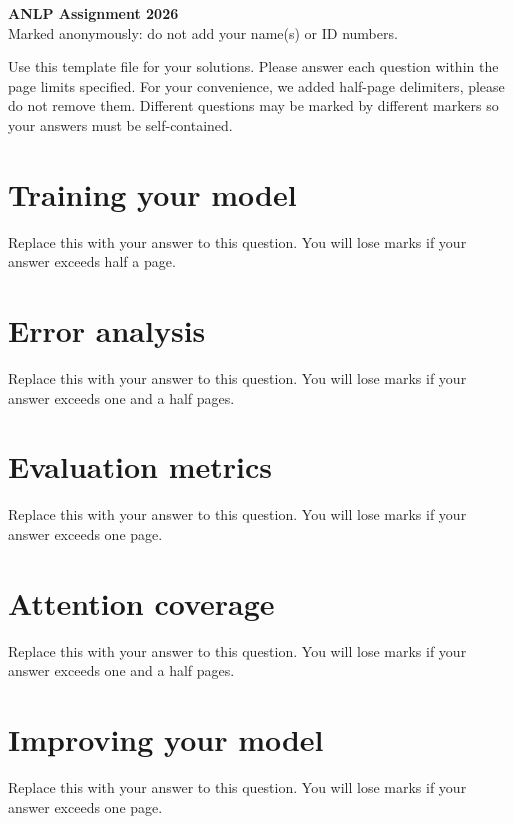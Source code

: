 \documentclass[11pt,a4paper]{article}
\begin{document}
\begin{center}
{\Large\bf ANLP Assignment 2026}\\ \large Marked anonymously: do not add your name(s) or ID numbers.\\[2mm]
\end{center}

Use this template file for your solutions. Please answer each question within the page limits specified. For your convenience, we added half-page delimiters, please do not remove them. Different questions may be marked by different markers so your answers must be self-contained.

\newpage
\section{Training your model}
Replace this with your answer to this question. You will lose marks if your answer exceeds half a page.

\newpage
\section{Error analysis}
Replace this with your answer to this question. You will lose marks if your answer exceeds one and a half pages.

\newpage
\section{Evaluation metrics}
Replace this with your answer to this question. You will lose marks if your answer exceeds one page.

\newpage
\section{Attention coverage}
Replace this with your answer to this question. You will lose marks if your answer exceeds one and a half pages.

\newpage
\section{Improving your model}
Replace this with your answer to this question. You will lose marks if your answer exceeds one page.
\end{document}
